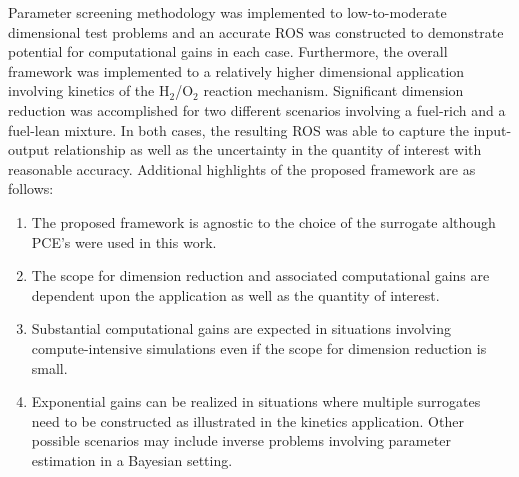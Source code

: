 Parameter screening methodology was implemented to low-to-moderate dimensional
test problems and an accurate ROS was constructed to demonstrate potential for
computational gains in each case. Furthermore, the overall framework was
implemented  to a relatively higher dimensional application involving kinetics
of the H$_2$/O$_2$ reaction mechanism.  Significant dimension reduction was
accomplished for two different scenarios involving a fuel-rich and a fuel-lean
mixture. In both cases, the resulting ROS was able to capture the input-output
relationship as well as the uncertainty in the quantity of interest with
reasonable accuracy. Additional highlights of the proposed framework are as
follows:
\begin{enumerate}
\item The proposed framework is agnostic to the choice of the surrogate although PCE's were used
in this work. 
\item The scope for dimension reduction and associated computational gains are
dependent upon the application as well as the quantity of interest. 
\item Substantial computational gains are expected in situations involving
compute-intensive simulations even if the scope for dimension reduction is
small. 

\item Exponential gains can be realized in situations where multiple surrogates need to be
constructed as illustrated in the kinetics application. Other possible scenarios may
include inverse problems involving parameter estimation in a Bayesian setting. 
\end{enumerate}

